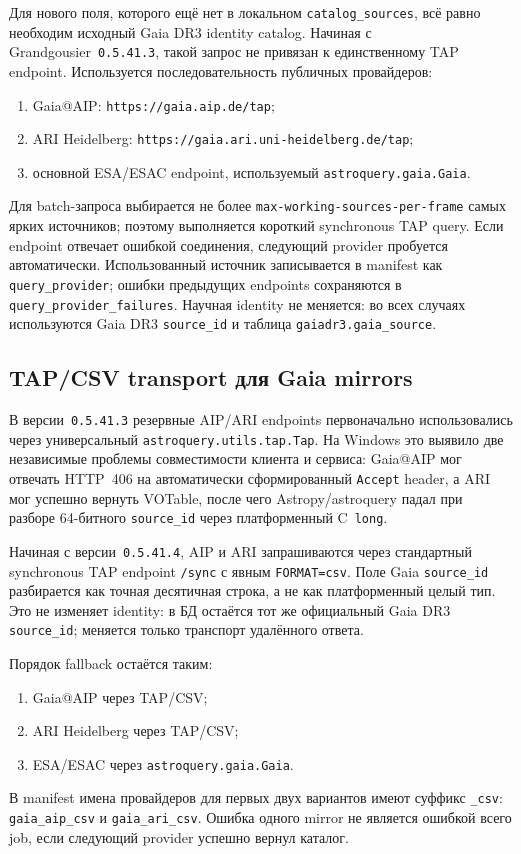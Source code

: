 Для нового поля, которого ещё нет в локальном \texttt{catalog\_sources}, всё равно необходим исходный Gaia DR3 identity catalog. Начиная с Grandgousier~\texttt{0.5.41.3}, такой запрос не привязан к единственному TAP endpoint. Используется последовательность публичных провайдеров:

\begin{enumerate}
  \item Gaia@AIP: \texttt{https://gaia.aip.de/tap};
  \item ARI Heidelberg: \texttt{https://gaia.ari.uni-heidelberg.de/tap};
  \item основной ESA/ESAC endpoint, используемый \texttt{astroquery.gaia.Gaia}.
\end{enumerate}

Для batch-запроса выбирается не более \texttt{max-working-sources-per-frame} самых ярких источников; поэтому выполняется короткий synchronous TAP query. Если endpoint отвечает ошибкой соединения, следующий provider пробуется автоматически. Использованный источник записывается в manifest как \texttt{query\_provider}; ошибки предыдущих endpoints сохраняются в \texttt{query\_provider\_failures}. Научная identity не меняется: во всех случаях используются Gaia DR3 \texttt{source\_id} и таблица \texttt{gaiadr3.gaia\_source}.


\subsection{TAP/CSV transport для Gaia mirrors}

В версии~\texttt{0.5.41.3} резервные AIP/ARI endpoints первоначально использовались через универсальный \texttt{astroquery.utils.tap.Tap}. На Windows это выявило две независимые проблемы совместимости клиента и сервиса: Gaia@AIP мог отвечать HTTP~406 на автоматически сформированный \texttt{Accept} header, а ARI мог успешно вернуть VOTable, после чего Astropy/astroquery падал при разборе 64-битного \texttt{source\_id} через платформенный C~\texttt{long}.

Начиная с версии~\texttt{0.5.41.4}, AIP и ARI запрашиваются через стандартный synchronous TAP endpoint \texttt{/sync} с явным \texttt{FORMAT=csv}. Поле Gaia \texttt{source\_id} разбирается как точная десятичная строка, а не как платформенный целый тип. Это не изменяет identity: в БД остаётся тот же официальный Gaia DR3 \texttt{source\_id}; меняется только транспорт удалённого ответа.

Порядок fallback остаётся таким:
\begin{enumerate}
  \item Gaia@AIP через TAP/CSV;
  \item ARI Heidelberg через TAP/CSV;
  \item ESA/ESAC через \texttt{astroquery.gaia.Gaia}.
\end{enumerate}

В manifest имена провайдеров для первых двух вариантов имеют суффикс \texttt{\_csv}: \texttt{gaia\_aip\_csv} и \texttt{gaia\_ari\_csv}. Ошибка одного mirror не является ошибкой всего job, если следующий provider успешно вернул каталог.
